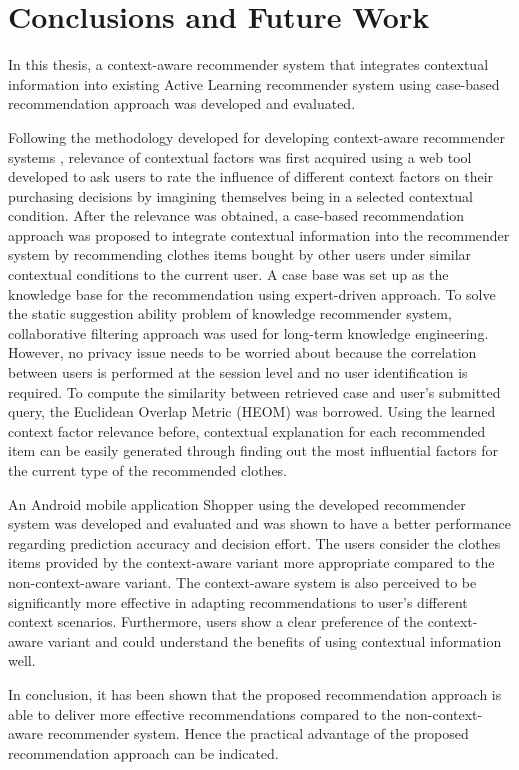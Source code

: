 \chapter{Conclusions and Future Work}\label{chapter:conclusions}

In this thesis, a context-aware recommender system that integrates contextual information into existing Active Learning recommender system using case-based recommendation approach was developed and evaluated.

Following the methodology developed for developing context-aware recommender systems \cite{ref:5}, relevance of contextual factors was first acquired using a web tool developed to ask users to rate the influence of different context factors on their purchasing decisions by imagining themselves being in a selected contextual condition. After the relevance was obtained, a case-based recommendation approach was proposed to integrate contextual information into the recommender system by recommending clothes items bought by other users under similar contextual conditions to the current user. A case base was set up as the knowledge base for the recommendation using expert-driven approach. To solve the static suggestion ability problem of knowledge recommender system, collaborative filtering approach was used for long-term knowledge engineering. However, no privacy issue needs to be worried about because the correlation between users is performed at the session level and no user identification is required. To compute the similarity between retrieved case and user's submitted query, the Euclidean Overlap Metric (HEOM) was borrowed. Using the learned context factor relevance before, contextual explanation for each recommended item can be easily generated through finding out the most influential factors for the current type of the recommended clothes.

An Android mobile application Shopper using the developed recommender system was developed and evaluated and was shown to have a better performance regarding prediction accuracy and decision effort. The users consider the clothes items provided by the context-aware variant more appropriate compared to the non-context-aware variant. The context-aware system is also perceived to be significantly more effective in adapting recommendations to user's different context scenarios. Furthermore, users show a clear preference of the context-aware variant and could understand the benefits of using contextual information well. 

In conclusion, it has been shown that the proposed recommendation approach is able to deliver more effective recommendations compared to the non-context-aware recommender system. Hence the practical advantage of the proposed recommendation approach can be indicated.

